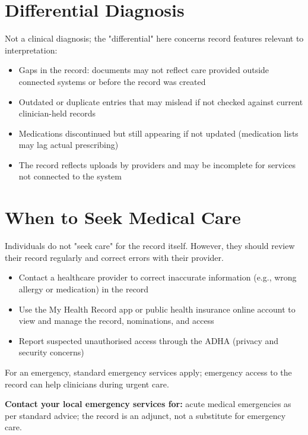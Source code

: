 \section*{Differential Diagnosis}
Not a clinical diagnosis; the "differential" here concerns record features relevant to interpretation:
\begin{itemize}
    \item Gaps in the record: documents may not reflect care provided outside connected systems or before the record was created
    \item Outdated or duplicate entries that may mislead if not checked against current clinician-held records
    \item Medications discontinued but still appearing if not updated (medication lists may lag actual prescribing)
    \item The record reflects uploads by providers and may be incomplete for services not connected to the system
\end{itemize}

\section*{When to Seek Medical Care}
Individuals do not "seek care" for the record itself. However, they should review their record regularly and correct errors with their provider.
\begin{itemize}
    \item Contact a healthcare provider to correct inaccurate information (e.g., wrong allergy or medication) in the record
    \item Use the My Health Record app or public health insurance online account to view and manage the record, nominations, and access
    \item Report suspected unauthorised access through the ADHA (privacy and security concerns)
\end{itemize}
For an emergency, standard emergency services apply; emergency access to the record can help clinicians during urgent care.

\textbf{Contact your local emergency services for:} acute medical emergencies as per standard advice; the record is an adjunct, not a substitute for emergency care.

